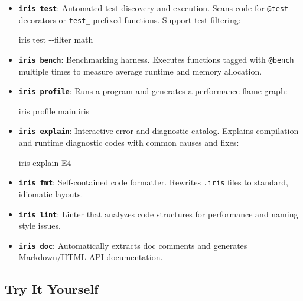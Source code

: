\documentclass[
  english,
]{book}
\newenvironment{Shaded}{\begin{snugshade}}{\end{snugshade}}
\newcommand{\AttributeTok}[1]{\textcolor[rgb]{0.83,0.83,0.83}{#1}}
\newcommand{\ExtensionTok}[1]{\textcolor[rgb]{0.83,0.83,0.83}{#1}}
\newcommand{\NormalTok}[1]{\textcolor[rgb]{0.83,0.83,0.83}{#1}}
\begin{document}
\begin{itemize}
\item
  \textbf{\texttt{iris\ test}}: Automated test discovery and execution.
  Scans code for \texttt{@test} decorators or \texttt{test\_} prefixed
  functions. Support test filtering:

\begin{Shaded}
\begin{Highlighting}[]
\ExtensionTok{iris}\NormalTok{ test }\AttributeTok{{-}{-}filter}\NormalTok{ math}
\end{Highlighting}
\end{Shaded}
\item
  \textbf{\texttt{iris\ bench}}: Benchmarking harness. Executes
  functions tagged with \texttt{@bench} multiple times to measure
  average runtime and memory allocation.
\item
  \textbf{\texttt{iris\ profile}}: Runs a program and generates a
  performance flame graph:

\begin{Shaded}
\begin{Highlighting}[]
\ExtensionTok{iris}\NormalTok{ profile main.iris}
\end{Highlighting}
\end{Shaded}
\item
  \textbf{\texttt{iris\ explain}}: Interactive error and diagnostic
  catalog. Explains compilation and runtime diagnostic codes with common
  causes and fixes:

\begin{Shaded}
\begin{Highlighting}[]
\ExtensionTok{iris}\NormalTok{ explain E4}
\end{Highlighting}
\end{Shaded}
\item
  \textbf{\texttt{iris\ fmt}}: Self-contained code formatter. Rewrites
  \texttt{.iris} files to standard, idiomatic layouts.
\item
  \textbf{\texttt{iris\ lint}}: Linter that analyzes code structures for
  performance and naming style issues.
\item
  \textbf{\texttt{iris\ doc}}: Automatically extracts doc comments and
  generates Markdown/HTML API documentation.
\end{itemize}

\subsection{Try It Yourself}\label{try-it-yourself-15}
\end{document}
